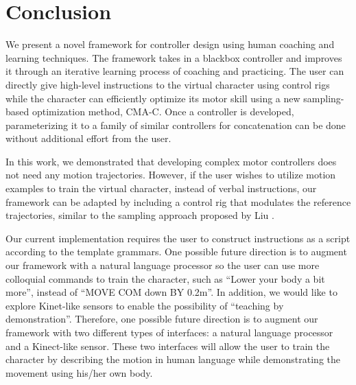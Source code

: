 \section{Conclusion}
We present a novel framework for controller design using human
coaching and learning techniques. The framework takes in a blackbox
controller and improves it through an iterative learning process of
coaching and practicing. The user can directly give high-level
instructions to the virtual character using control rigs while the
character can efficiently optimize its motor skill using a new
sampling-based optimization method, CMA-C. Once a controller is
developed, parameterizing it to a family of similar controllers for
concatenation can be done without additional effort from the user.

In this work, we demonstrated that developing complex motor
controllers does not need any motion trajectories. However, if the
user wishes to utilize motion examples to train the virtual character,
instead of verbal instructions, our framework can be adapted by
including a control rig that modulates the reference trajectories,
similar to the sampling approach proposed by Liu \etal
\cite{Liu:2010:SCM,Liu:2012:TRC}. 

Our current implementation requires the user to construct
instructions as a script according to the template grammars. One
possible future direction is to augment our framework with a natural
language processor so the user can use more colloquial
commands to train the character, such as ``Lower your body a bit
more'', instead of ``MOVE COM down BY 0.2m''. In addition, we would
like to explore Kinet-like sensors to enable the possibility of ``teaching by demonstration''.
Therefore, one possible future direction is to augment our framework
with two different types of interfaces: a natural language processor
and a Kinect-like sensor. These two interfaces will allow the user to
train the character by describing the motion in human language while
demonstrating the movement using his/her own body.
